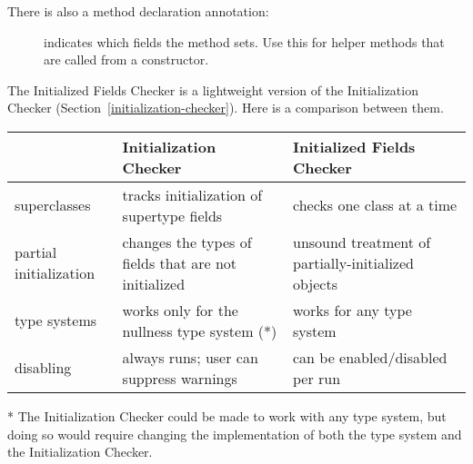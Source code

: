 
There is also a method declaration annotation:

\begin{description}
\item[]
  indicates which fields the method sets.  Use this for helper methods that
  are called from a constructor.
\end{description}



The Initialized Fields Checker is a lightweight version of the  Initialization Checker
(Section~\ref{initialization-checker}).  Here is a comparison between them.

\noindent
\begin{small}
\begin{tabular}{| l | l | l |}
 \hline
 & Initialization Checker & Initialized Fields Checker
 \\ \hline
 superclasses
 & tracks initialization of supertype fields
 & checks one class at a time
 \\
 partial initialization
 & changes the types of fields that are not initialized
 & unsound treatment of partially-initialized objects
 \\
 type systems
 & works only for the nullness type system (*)
 & works for any type system
 \\
 disabling
 & always runs; user can suppress warnings
 & can be enabled/disabled per run
 \\
 \hline
\end{tabular}

\noindent
* The Initialization Checker could be made to work with any type system, but
doing so would require changing the implementation of both the type system and
the Initialization Checker.
\end{small}


